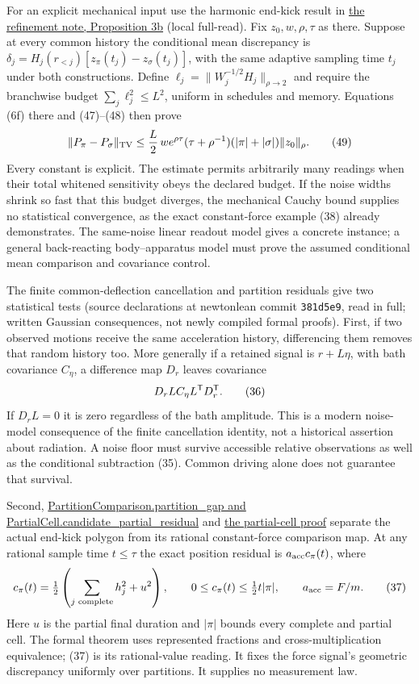 \documentclass[11pt,a4paper]{article}
\begin{document}
For an explicit mechanical input use the harmonic end-kick result in
\href{refinement-composition-and-limit.md\#3b-harmonic-polygons-a-finite-refinement-bound-from-a-different-norm}{the
refinement note, Proposition 3b} (local full-read). Fix
\(z_0,w,\rho,\tau\) as there. Suppose at every common history the
conditional mean discrepancy is
\(\delta_j=H_j(r_{<j})[z_\pi(t_j)-z_\sigma(t_j)]\), with the same
adaptive sampling time \(t_j\) under both constructions. Define
\(\ell_j=\|W_j^{-1/2}H_j\|_{\rho\to2}\) and require the branchwise
budget \(\sum_j\ell_j^2\le L^2\), uniform in schedules and memory.
Equations (6f) there and (47)--(48) then prove
\[\|P_\pi-P_\sigma\|_{\rm TV}
\le\frac L2\,w e^{\rho\tau}(\tau+\rho^{-1})
 (|\pi|+|\sigma|)\|z_0\|_\rho.\tag{49}\] Every constant is explicit. The
estimate permits arbitrarily many readings when their total whitened
sensitivity obeys the declared budget. If the noise widths shrink so
fast that this budget diverges, the mechanical Cauchy bound supplies no
statistical convergence, as the exact constant-force example (38)
already demonstrates. The same-noise linear readout model gives a
concrete instance; a general back-reacting body--apparatus model must
prove the assumed conditional mean comparison and covariance control.

The finite common-deflection cancellation and partition residuals give
two statistical tests (source declarations at newtonlean commit
\texttt{381d5e9}, read in full; written Gaussian consequences, not newly
compiled formal proofs). First, if two observed motions receive the same
acceleration history, differencing them removes that random history too.
More generally if a retained signal is \(r+L\eta\), with bath covariance
\(C_\eta\), a difference map \(D_r\) leaves covariance
\[D_rL C_\eta L^{\sf T}D_r^{\sf T}.\tag{36}\] If \(D_rL=0\) it is zero
regardless of the bath amplitude. This is a modern noise-model
consequence of the finite cancellation identity, not a historical
assertion about radiation. A noise floor must survive accessible
relative observations as well as the conditional subtraction (35).
Common driving alone does not guarantee that survival.

Second,
\href{https://github.com/arivero/newtonlean/blob/381d5e9/NewtonLimitDynamics/Polygon/PartitionComparison.lean}{PartitionComparison.partition\_gap
and PartialCell.candidate\_partial\_residual} and
\href{https://github.com/arivero/newtonlean/blob/381d5e9/NewtonLimitDynamics/Polygon/PartialCell.lean}{the
partial-cell proof} separate the actual end-kick polygon from its
rational constant-force comparison map. At any rational sample time
\(t\le\tau\) the exact position residual is \(a_{\rm acc}c_\pi(t)\),
where \[c_\pi(t)=\tfrac12\left(\sum_{j\text{ complete}}h_j^2+u^2\right),
\qquad0\le c_\pi(t)\le\tfrac12t|\pi|,\qquad
a_{\rm acc}=F/m.\tag{37}\] Here \(u\) is the partial final duration and
\(|\pi|\) bounds every complete and partial cell. The formal theorem
uses represented fractions and cross-multiplication equivalence; (37) is
its rational-value reading. It fixes the force signal's geometric
discrepancy uniformly over partitions. It supplies no measurement law.
\end{document}
